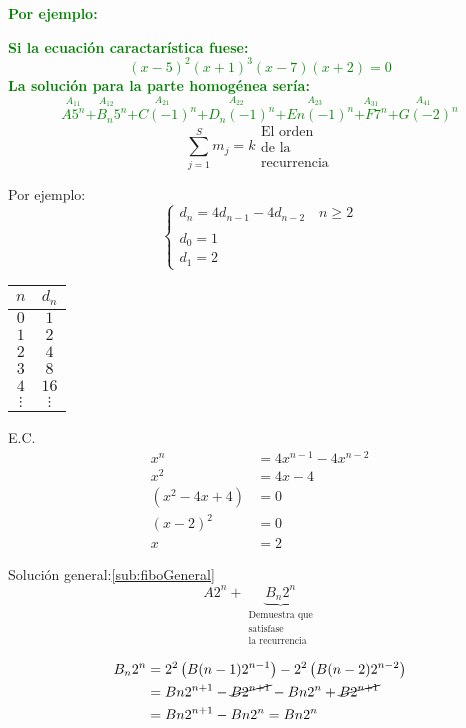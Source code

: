 \documentclass[../main.tex]{subfiles}
\begin{document}
{
	\Large\bfseries
	\textcolor{green}{Por ejemplo:}
}

\textcolor{green}
{
	\bfseries\boldmath
	Si la ecuación caractarística fuese:
	\[
		(x-5)^2
		(x+1)^3
		(x-7)
		(x+2)
		=0
	\]
	La solución para la parte homogénea sería:
	\[
		\overset{A_{11}}
		{
			A5^n
		}
		\overset{A_{12}}
		{
			+B_n5^n
		}
		\overset{A_{21}}
		{
			+C(-1)^n
		}
		\overset{A_{22}}
		{
			+D_n(-1)^n
		}
		\overset{A_{23}}
		{
			+En(-1)^n
		}
		\overset{A_{31}}
		{
			+F7^n
		}
		\overset{A_{41}}
		{
			+G(-2)^n
		}
	\]
}
\[
	\sum_{j=1}^{S}m_j = k
	\substack
	{
		\text{El orden}\\
		\text{de la}\\
		\text{recurrencia}
	}
\]

Por ejemplo:
\[
	\begin{cases}
		d_n = 4d_{n-1}-4d_{n-2}\quad n \geq 2\\
		\\
		d_0=1\\
		d_1=2
	\end{cases}
\]
\begin{center}
	\begin{tabular}{c|c}
		$n$ & $d_n$\\
		\hline
		$0$ & $1$\\
		$1$ & $2$\\
		$2$ & $4$\\
		$3$ & $8$\\
		$4$ & $16$\\
		$\vdots$ & $\vdots$
	\end{tabular}
\end{center}

E.C.
\begin{align*}
	x^n  &=  4x^{n-1}-4x^{n-2}\\
	x^2 &= 4x-4\\
	(x^2-4x+4) &= 0\\
	(x-2)^2 &= 0\\
	x &= 2
\end{align*}

Solución general:\ref{sub:fiboGeneral}
\[
	A2^n+
	\underbrace
	{
		B_n2^n
	}_
	{
		\substack
		{
			\text{Demuestra que}\\
			\text{satisfase}\\
			\text{la recurrencia}
		}
	}
\]

\begin{align*}
	B_n2^n &=
	2^2
	\left(
		B(n-1)2^{n-1}
	\right)
	-2^2
	\left(
		B(n-2)2^{n-2}
	\right)\\
	&= Bn2^{n+1}
	-\cancel{B2^{n+1}}
	-Bn2^n
	+\cancel{B2^{n+1}}\\
	&= Bn2^{n+1}
	-Bn2^n
	=Bn2^n
\end{align*}
\end{document}
